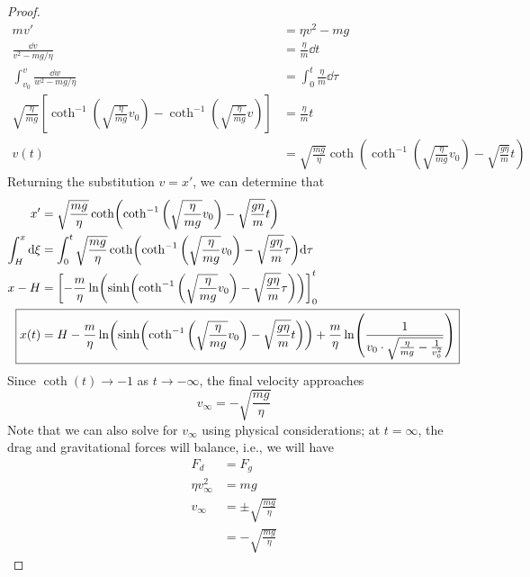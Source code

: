 \documentclass[../psets.tex]{subfiles}
\begin{document}
\begin{enumerate}
\begin{proof}
        \begin{align*}
            mv' &= \eta v^2-mg\\
            \frac{\dd{v}}{v^2-mg/\eta} &= \frac{\eta}{m}\dd{t}\\
            \int_{v_0}^v\frac{\dd{w}}{w^2-mg/\eta} &= \int_0^t\frac{\eta}{m}\dd{\tau}\\
            \sqrt{\frac{\eta}{mg}}\left[ \coth^{-1}\left( \sqrt{\frac{\eta}{mg}}v_0 \right)-\coth^{-1}\left( \sqrt{\frac{\eta}{mg}}v \right) \right] &= \frac{\eta}{m}t\\
            v(t) &= \sqrt{\frac{mg}{\eta}}\coth(\coth^{-1}\left( \sqrt{\frac{\eta}{mg}}v_0 \right)-\sqrt{\frac{g\eta}{m}}t)
        \end{align*}
        Returning the substitution $v=x'$, we can determine that
        \begin{align*}
            x' &= \sqrt{\frac{mg}{\eta}}\coth(\coth^{-1}\left( \sqrt{\frac{\eta}{mg}}v_0 \right)-\sqrt{\frac{g\eta}{m}}t)\\
            \int_H^x\dd\xi &= \int_0^t\sqrt{\frac{mg}{\eta}}\coth(\coth^{-1}\left( \sqrt{\frac{\eta}{mg}}v_0 \right)-\sqrt{\frac{g\eta}{m}}\tau)\dd\tau\\
            x-H &= \left[ -\frac{m}{\eta}\ln(\sinh(\coth^{-1}\left( \sqrt{\frac{\eta}{mg}}v_0 \right)-\sqrt{\frac{g\eta}{m}}\tau)) \right]_0^t\\
            \Aboxed{x(t) &= H-\frac{m}{\eta}\ln(\sinh(\coth^{-1}\left( \sqrt{\frac{\eta}{mg}}v_0 \right)-\sqrt{\frac{g\eta}{m}}t))+\frac{m}{\eta}\ln(\frac{1}{v_0\cdot\sqrt{\frac{\eta}{mg}-\frac{1}{v_0^2}}})}
        \end{align*}
        Since $\coth(t)\to -1$ as $t\to -\infty$, the final velocity approaches
        \begin{equation*}
            \boxed{v_\infty = -\sqrt{\frac{mg}{\eta}}}
        \end{equation*}
        Note that we can also solve for $v_\infty$ using physical considerations; at $t=\infty$, the drag and gravitational forces will balance, i.e., we will have
        \begin{align*}
            F_d &= F_g\\
            \eta v_\infty^2 &= mg\\
            v_\infty &= \pm\sqrt{\frac{mg}{\eta}}\\
            &= -\sqrt{\frac{mg}{\eta}}
        \end{align*}
    \end{proof}
\end{enumerate}
\end{document}

